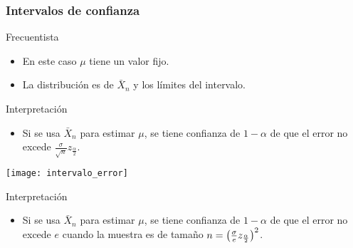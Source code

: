 \documentclass[table]{beamer}
\begin{document}
\begin{frame}
    \frametitle{Intervalos de confianza}
    \begin{block}{Frecuentista}
        \begin{itemize}
            \item En este caso $\mu$ tiene un valor fijo.
            \item La distribución es de $\bar{X}_{n}$ y los límites del intervalo.
        \end{itemize}
    \end{block}
    \begin{block}{Interpretación}
        \begin{itemize}
            \item Si se usa $\bar{X}_{n}$ para estimar $\mu$, se tiene confianza de $1 - \alpha$ de que el error no excede $\frac{\sigma}{\sqrt{n}} z_{\frac{\alpha}{2}}$.
        \end{itemize}
    \end{block}
    \begin{center}
        \texttt{[image: intervalo\_error]}
    \end{center}
    \begin{block}{Interpretación}
        \begin{itemize}
            \item Si se usa $\bar{X}_{n}$ para estimar $\mu$, se tiene confianza de $1 - \alpha$ de que el error no excede $e$ cuando la muestra es de tamaño $n = \parens{\frac{\sigma}{e} z_{\frac{\alpha}{2}}}^{2}$.
        \end{itemize}
    \end{block}
\end{frame}
\end{document}
